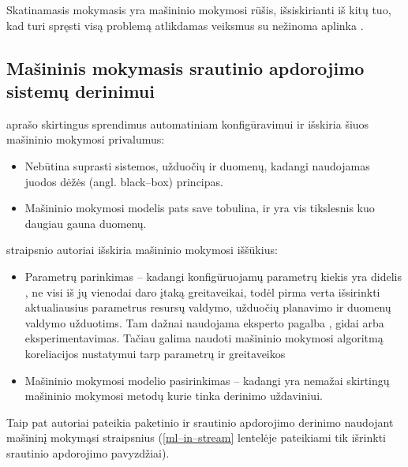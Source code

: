 \documentclass{VUMIFPSbakalaurinis}
\begin{document}
Skatinamasis mokymasis yra mašininio mokymosi rūšis, išsiskirianti iš kitų tuo, kad turi spręsti visą problemą atlikdamas veiksmus su nežinoma aplinka \cite{sutton2018reinforcement}. 

\subsection{Mašininis mokymasis srautinio apdorojimo sistemų derinimui}

\cite{herodotou2020survey} aprašo skirtingus sprendimus automatiniam konfigūravimui ir išskiria šiuos mašininio mokymosi privalumus:
\begin{itemize}
    \item Nebūtina suprasti sistemos, užduočių ir duomenų, kadangi naudojamas juodos dėžės (angl. black–box) principas.
    \item Mašininio mokymosi modelis pats save tobulina, ir yra vis tikslesnis kuo daugiau gauna duomenų. 
\end{itemize}
\cite{herodotou2020survey} straipsnio autoriai išskiria mašininio mokymosi iššūkius: 
\begin{itemize}
    \item Parametrų parinkimas – kadangi konfigūruojamų parametrų kiekis yra didelis \cite{Bilal2017Towards, petridis2016spark}, ne visi iš jų vienodai daro įtaką greitaveikai, todėl pirma verta išsirinkti aktualiausius parametrus resursų valdymo, užduočių planavimo ir duomenų valdymo užduotims. Tam dažnai naudojama eksperto pagalba \cite{wang2016novel}, gidai arba eksperimentavimas. Tačiau galima naudoti mašininio mokymosi algoritmą koreliacijos nustatymui tarp parametrų ir greitaveikos \cite{vaquero2018autotuning, yang2012statistics}
    \item Mašininio mokymosi modelio pasirinkimas – kadangi yra nemažai skirtingų mašininio mokymosi metodų kurie tinka derinimo uždaviniui.
\end{itemize} 
Taip pat autoriai pateikia paketinio ir srautinio apdorojimo derinimo naudojant mašininį mokymąsi straipsnius (\ref{ml–in–stream} lentelėje pateikiami tik išrinkti srautinio apdorojimo pavyzdžiai).
\end{document}
